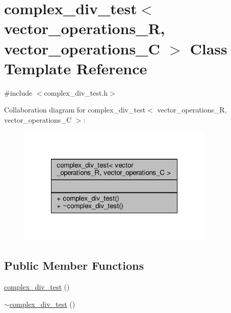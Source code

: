 \hypertarget{classcomplex__div__test}{\section{complex\-\_\-div\-\_\-test$<$ vector\-\_\-operations\-\_\-\-R, vector\-\_\-operations\-\_\-\-C $>$ Class Template Reference}
\label{classcomplex__div__test}
}


{\ttfamily \#include $<$complex\-\_\-div\-\_\-test.\-h$>$}



Collaboration diagram for complex\-\_\-div\-\_\-test$<$ vector\-\_\-operations\-\_\-\-R, vector\-\_\-operations\-\_\-\-C $>$\-:
\nopagebreak
\begin{figure}[H]
\begin{center}
\leavevmode
\includegraphics[width=264pt]{classcomplex__div__test__coll__graph}
\end{center}
\end{figure}
\subsection*{Public Member Functions}
\begin{DoxyCompactItemize}
\item 
\hyperlink{classcomplex__div__test_a3d35997bd401baeaaa5465d9b2501c04}{complex\-\_\-div\-\_\-test} ()
\item 
\hyperlink{classcomplex__div__test_a35749261def21774893118c1bdde22e8}{$\sim$complex\-\_\-div\-\_\-test} ()
\end{DoxyCompactItemize}


